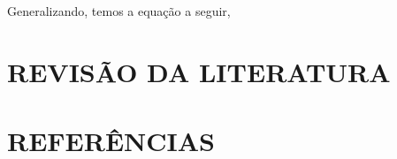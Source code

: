 \documentclass[
  12pt,
  letterpaper,
  DIV=11,
  numbers=noendperiod]{scrartcl}
\begin{document}
Generalizando, temos a equação a seguir,

\hypertarget{revisuxe3o-da-literatura}{%
\section{REVISÃO DA LITERATURA}\label{revisuxe3o-da-literatura}}

\newpage

\hypertarget{referuxeancias}{%
\section*{REFERÊNCIAS}\label{referuxeancias}}


\end{document}
